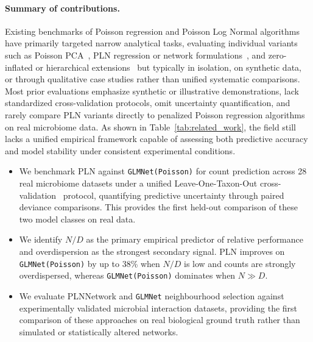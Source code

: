\documentclass{jmlr}
\begin{document}
\paragraph{Summary of contributions.}
Existing benchmarks of Poisson regression and Poisson Log Normal algorithms have primarily targeted narrow analytical tasks, evaluating individual variants such as Poisson PCA~\cite{Kenney2021PoissonPCA, Virta2023PoissonPCA}, PLN regression or network formulations~\cite{Chiquet2021, Xiao2022PLNet}, and zero-inflated or hierarchical extensions~\cite{Batardiere2025ZIPLN, Chaussard2025PLNTree} but typically in isolation, on synthetic data, or through qualitative case studies rather than unified systematic comparisons.
Most prior evaluations emphasize synthetic or illustrative demonstrations, lack standardized cross-validation protocols, omit uncertainty quantification, and rarely compare PLN variants directly to penalized Poisson regression algorithms on real microbiome data. 
As shown in Table~\ref{tab:related_work}, the field still lacks a unified empirical framework capable of assessing both predictive accuracy and model stability under consistent experimental conditions.

\begin{itemize}
  \item We benchmark PLN against \texttt{GLMNet(Poisson)} for count prediction across 28 real microbiome datasets under a unified Leave-One-Taxon-Out cross-validation~\cite{agyapong2025cross} protocol, quantifying predictive uncertainty through paired deviance comparisons. This provides the first held-out comparison of these two model classes on real data.
  \item We identify $N/D$ as the primary empirical predictor of relative performance and overdispersion as the strongest secondary signal. PLN improves on \texttt{GLMNet(Poisson)} by up to 38\% when $N/D$ is low and counts are strongly overdispersed, whereas \texttt{GLMNet(Poisson)} dominates when $N \gg D$.
  \item We evaluate PLNNetwork and \texttt{GLMNet} neighbourhood selection against experimentally validated microbial interaction datasets, providing the first comparison of these approaches on real biological ground truth rather than simulated or statistically altered networks.
\end{itemize}
\end{document}

